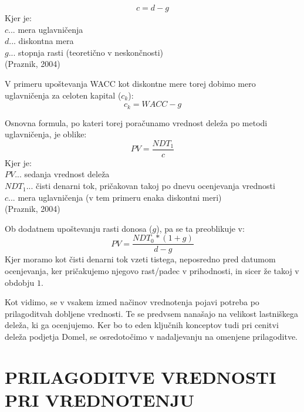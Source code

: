 \documentclass[12pt,a4paper]{amsart}
\theoremstyle{definition} %
\theoremstyle{plain} %
\begin{document}
\begin{equation}
c=d-g
\end{equation}
Kjer je:\\
$c$... mera uglavničenja\\
$d$... diskontna mera\\
$g$... stopnja rasti (teoretično v neskončnosti)\\
(Praznik, 2004)\par

V primeru upoštevanja WACC kot diskontne mere torej dobimo mero uglavničenja za celoten kapital ($c_k$):
\begin{equation}
c_k=WACC-g
\end{equation}

Osnovna formula, po kateri torej poračunamo vrednost deleža po metodi uglavničenja, je oblike:
\begin{equation}
PV=\frac{NDT_1}{c}
\end{equation}
Kjer je:\\
$PV$... sedanja vrednost deleža\\
$NDT_1$... čisti denarni tok, pričakovan takoj po dnevu ocenjevanja vrednosti\\
$c$... mera uglavničenja (v tem primeru enaka diskontni meri)\\
(Praznik, 2004)\par

Ob dodatnem upoštevanju rasti donosa ($g$), pa se ta preoblikuje v:
\begin{equation}
PV=\frac{NDT_0*(1+g)}{d-g}
\end{equation}
Kjer moramo kot čisti denarni tok vzeti tistega, neposredno pred datumom ocenjevanja, ker pričakujemo njegovo rast/padec v prihodnosti, in sicer že takoj v obdobju $1$.\par

Kot vidimo, se v vsakem izmed načinov vrednotenja pojavi potreba po prilagoditvah dobljene vrednosti. Te se predvsem nanašajo na velikost lastniškega deleža, ki ga ocenjujemo. Ker bo to eden ključnih konceptov tudi pri cenitvi deleža podjetja Domel, se osredotočimo v nadaljevanju na omenjene prilagoditve.




\section{\textbf{PRILAGODITVE VREDNOSTI PRI VREDNOTENJU}}
\end{document}

